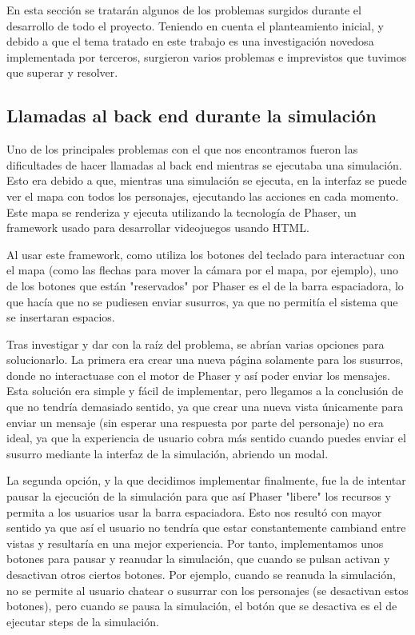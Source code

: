En esta sección se tratarán algunos de los problemas surgidos durante el desarrollo de todo el proyecto. Teniendo en cuenta el planteamiento inicial, y debido a que el tema tratado en este trabajo es una investigación novedosa implementada por terceros, surgieron varios problemas e imprevistos que tuvimos que superar y resolver.

\subsection{Llamadas al back end durante la simulación}

Uno de los principales problemas con el que nos encontramos fueron las dificultades de hacer llamadas al back end mientras se ejecutaba una simulación. Esto era debido a que, mientras una simulación se ejecuta, en la interfaz se puede ver el mapa con todos los personajes, ejecutando las acciones en cada momento. Este mapa se renderiza y ejecuta utilizando la tecnología de Phaser, un framework usado para desarrollar videojuegos usando HTML.

Al usar este framework, como utiliza los botones del teclado para interactuar con el mapa (como las flechas para mover la cámara por el mapa, por ejemplo), uno de los botones que están "reservados" por Phaser es el de la barra espaciadora, lo que hacía que no se pudiesen enviar susurros, ya que no permitía el sistema que se insertaran espacios.

Tras investigar y dar con la raíz del problema, se abrían varias opciones para solucionarlo. La primera era crear una nueva página solamente para los susurros, donde no interactuase con el motor de Phaser y así poder enviar los mensajes. Esta solución era simple y fácil de implementar, pero llegamos a la conclusión de que no tendría demasiado sentido, ya que crear una nueva vista únicamente para enviar un mensaje (sin esperar una respuesta por parte del personaje) no era ideal, ya que la experiencia de usuario cobra más sentido cuando puedes enviar el susurro mediante la interfaz de la simulación, abriendo un modal.

La segunda opción, y la que decidimos implementar finalmente, fue la de intentar pausar la ejecución de la simulación para que así Phaser "libere" los recursos y permita a los usuarios usar la barra espaciadora. Esto nos resultó con mayor sentido ya que así el usuario no tendría que estar constantemente cambiand entre vistas y resultaría en una mejor experiencia. Por tanto, implementamos unos botones para pausar y reanudar la simulación, que cuando se pulsan activan y desactivan otros ciertos botones. Por ejemplo, cuando se reanuda la simulación, no se permite al usuario chatear o susurrar con los personajes (se desactivan estos botones), pero cuando se pausa la simulación, el botón que se desactiva es el de ejecutar steps de la simulación.

